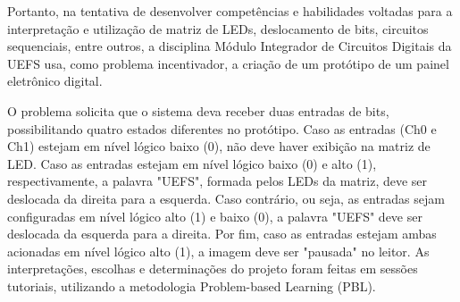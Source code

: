 Portanto, na tentativa de desenvolver competências e habilidades voltadas para a interpretação e utilização de matriz de LEDs, deslocamento de bits, circuitos sequenciais, entre outros, a disciplina Módulo Integrador de Circuitos Digitais da UEFS usa, como problema incentivador, a criação de um protótipo de um painel eletrônico digital.

O problema solicita que o sistema deva receber duas entradas de bits, possibilitando quatro estados diferentes no protótipo. Caso as entradas (Ch0 e Ch1) estejam em nível lógico baixo (0), não deve haver exibição na matriz de LED. Caso as entradas estejam em nível lógico baixo (0) e alto (1), respectivamente, a palavra "UEFS", formada pelos LEDs da matriz, deve ser deslocada da direita para a esquerda. Caso contrário, ou seja, as entradas sejam configuradas em nível lógico alto (1) e baixo (0), a palavra "UEFS" deve ser deslocada da esquerda para a direita. Por fim, caso as entradas estejam ambas acionadas em nível lógico alto (1), a imagem deve ser "pausada" no leitor. As interpretações, escolhas e determinações do projeto foram feitas em sessões tutoriais, utilizando a metodologia Problem-based Learning (PBL).
